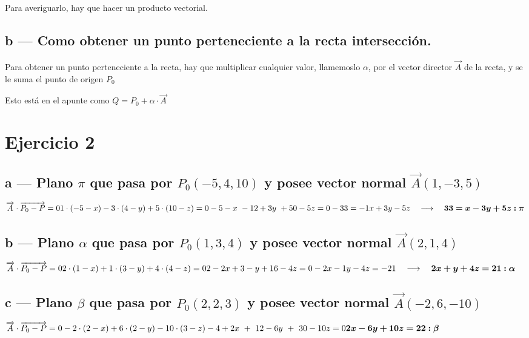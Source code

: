 \documentclass{article}
\newcommand{\vc}{\overrightarrow}
\newcommand{\x}{\cdot}
\begin{document}
		Para averiguarlo, hay que hacer un producto vectorial.
	\subsection{b --- Como obtener un punto perteneciente a la recta intersección.}
		Para obtener un punto perteneciente a la recta, hay que multiplicar cualquier valor, llamemoslo $\alpha$, 
		por el vector director $\vc{A}$ de la recta, y se le suma el punto de origen $P_0$

		Esto está en el apunte como $Q = P_0 + \alpha \x \vc{A}$

\section {Ejercicio 2}
	\subsection{a --- Plano $\pi$ que pasa por $P_0 (-5,4,10)$ y posee vector normal $\vec{A}(1,-3,5)$}
			$
			\vc{A} \cdot \vc{P_0 -P} = 0 \\
			1\x (-5-x) -3\x (4-y) +5\x (10-z) = 0 \\
			-5-x ~ -12+3y ~ +50-5z = 0\\
			-33 = -1x+3y-5z \quad\longrightarrow\quad \boldsymbol{33 = x-3y+5z : \pi} \\
			$
	\subsection{b --- Plano $\alpha$ que pasa por $P_0 (1,3,4)$ y posee vector normal $\vec{A} (2,1,4)$}
			$
			\vc{A} \cdot \vc{P_0 -P} = 0 \\
			2\x (1-x) + 1\x (3-y) + 4\x (4-z) = 0 \\
			2-2x + 3-y + 16-4z = 0 \\
			-2x -1y -4z = -21 \quad\longrightarrow\quad \boldsymbol{2x+y+4z = 21 : \alpha} \\
			$
	\subsection{c --- Plano $\beta$ que pasa por $P_0 (2,2,3)$ y posee vector normal $\vec{A} (-2,6,-10)$}
			$
			\vc{A} \cdot \vc{P_0 -P} = 0 \\
			-2\x (2-x)+6\x (2-y) -10\x (3-z) \\
			-4+2x ~+~ 12-6y ~+~ 30-10z = 0 \\
			\boldsymbol{2x -6y +10z = 22 :\beta} \\
			$
\end{document}
